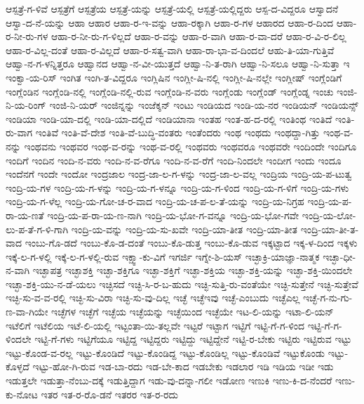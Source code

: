{ಆಸ್ಪತ್ರೆ-ಗ-ಳಿವೆ
ಆಸ್ಪತ್ರೆಗೆ
ಆಸ್ಪತ್ರೆಯ
ಆಸ್ಪತ್ರೆ-ಯನ್ನು
ಆಸ್ಪತ್ರೆ-ಯಲ್ಲಿ
ಆಸ್ಪತ್ರೆ-ಯಲ್ಲಿದ್ದರು
ಆಸ್ಪ-ದ-ವಿದ್ದರೂ
ಆಸ್ವಾದನೆ
ಆಸ್ವಾ-ದ-ನೆ-ಯನ್ನು
ಆಹಾ
ಆಹಾರ
ಆಹಾ-ರ-ಇ-ವನ್ನು
ಆಹಾ-ರಕ್ಕಾಗಿ
ಆಹಾ-ರ-ಗಳ
ಆಹಾರದ
ಆಹಾ-ರ-ದಿಂದ
ಆಹಾ-ರ-ನೀ-ರು-ಗಳ
ಆಹಾ-ರ-ನೀ-ರು-ಗ-ಳಿಲ್ಲದೆ
ಆಹಾ-ರ-ವನ್ನು
ಆಹಾ-ರ-ವಾಗಿ
ಆಹಾ-ರ-ವಾ-ದರೆ
ಆಹಾ-ರ-ವಿ-ರ-ಲಿಲ್ಲ
ಆಹಾ-ರ-ವಿಲ್ಲ-ದಂತೆ
ಆಹಾ-ರ-ವಿಲ್ಲದೆ
ಆಹಾ-ರ-ಸತ್ವ-ವಾಗಿ
ಆಹಾ-ರಾ-ಭಾ-ವ-ದಿಂದಲೆ
ಆಹು-ತಿ-ಯಾ-ಗುತ್ತಿವೆ
ಆಹ್ವಾ-ನ-ಗ-ಳನ್ನಿತ್ತರೂ
ಆಹ್ವಾನದ
ಆಹ್ವಾ-ನ-ವೀ-ಯುತ್ತದೆ
ಆಹ್ವಾ-ನಿ-ತ-ರಾಗಿ
ಆಹ್ವಾ-ನಿ-ಸಲೂ
ಆಹ್ವಾ-ನಿ-ಸುತ್ತಾ
ಇ
ಇಂಕ್ವಾ-ಯ-ರಿಸ್
ಇಂಗಿತ
ಇಂಗಿ-ತ-ವಿದ್ದರೂ
ಇಂಗ್ಲಿಷಿನ
ಇಂಗ್ಲೀ-ಷಿ-ನಲ್ಲಿ
ಇಂಗ್ಲೀ-ಷಿ-ನಲ್ಲೇ
ಇಂಗ್ಲೀಷ್
ಇಂಗ್ಲೆಂಡಿಗೆ
ಇಂಗ್ಲೆಂಡಿನ
ಇಂಗ್ಲೆಂಡಿ-ನಲ್ಲಿ
ಇಂಗ್ಲೆಂಡಿ-ನಲ್ಲಿ-ರುವ
ಇಂಗ್ಲೆಂಡಿ-ನ-ವರು
ಇಂಗ್ಲೆಂಡು
ಇಂಗ್ಲೆಂಡ್
ಇಂಗ್ಲೆಂಡ್ನ
ಇಂಚು
ಇಂಜಿ-ನಿ-ಯ-ರಿಂಗ್
ಇಂಜಿ-ನಿ-ಯರ್
ಇಂಜಿನ್ನನ್ನು
ಇಂಜೆಕ್ಶನ್
ಇಂಟು
ಇಂಡಿಯದ
ಇಂಡಿ-ಯ-ನರ
ಇಂಡಿಯನ್
ಇಂಡಿಯನ್ಸ್
ಇಂಡಿಯಾ
ಇಂಡಿ-ಯಾ-ದಲ್ಲಿ
ಇಂಡಿ-ಯಾ-ದಲ್ಲಿದೆ
ಇಂಡಿಯಾನಾ
ಇಂತಹ
ಇಂತ-ಹ-ದ-ರಲ್ಲಿ
ಇಂತಿಂಥ
ಇಂತಿದೆ
ಇಂತಿ-ರು-ವಾಗ
ಇಂತಿವೆ
ಇಂತಿ-ವೆ-ದೇಶ
ಇಂತಿ-ವೆ-ಬುದ್ಧಿ-ವಂತರು
ಇಂತೆಂದರು
ಇಂಥ
ಇಂಥದು
ಇಂಥದ್ದಾ-ಗಿತ್ತು
ಇಂಥ-ವ-ನನ್ನು
ಇಂಥವನು
ಇಂಥವರ
ಇಂಥ-ವ-ರನ್ನು
ಇಂಥ-ವ-ರಲ್ಲಿ
ಇಂಥವರು
ಇಂಥವರೂ
ಇಂಥವರೇ
ಇಂದಿಂದೇ
ಇಂದಿಗೂ
ಇಂದಿಗೆ
ಇಂದಿನ
ಇಂದಿ-ನ-ವರು
ಇಂದಿ-ನ-ವ-ರೆಗೂ
ಇಂದಿ-ನ-ವ-ರೆಗೆ
ಇಂದಿ-ನಿಂದಲೇ
ಇಂದೀಗ
ಇಂದು
ಇಂದೂ
ಇಂದೆನಗೆ
ಇಂದೇ
ಇಂದೋ
ಇಂದ್ರಜಾಲ
ಇಂದ್ರ-ಜಾ-ಲ-ಗ-ಳನ್ನು
ಇಂದ್ರ-ಜಾ-ಲ-ವಲ್ಲ
ಇಂದ್ರಿಯ
ಇಂದ್ರಿ-ಯ-ಪ-ಟುತ್ವ
ಇಂದ್ರಿ-ಯ-ಗಳ
ಇಂದ್ರಿ-ಯ-ಗ-ಳನ್ನು
ಇಂದ್ರಿ-ಯ-ಗ-ಳನ್ನೂ
ಇಂದ್ರಿ-ಯ-ಗ-ಳಿಂದ
ಇಂದ್ರಿ-ಯ-ಗ-ಳಿಗೆ
ಇಂದ್ರಿ-ಯ-ಗಳು
ಇಂದ್ರಿ-ಯ-ಗ-ಳೆಲ್ಲ
ಇಂದ್ರಿ-ಯ-ಗೋ-ಚ-ರ-ವಾದ
ಇಂದ್ರಿ-ಯ-ಚ-ಪ-ಲ-ತೆ-ಯನ್ನು
ಇಂದ್ರಿ-ಯ-ನಿಗ್ರಹ
ಇಂದ್ರಿ-ಯ-ಪ-ರಾ-ಯ-ಣತೆ
ಇಂದ್ರಿ-ಯ-ಪ-ರಾ-ಯ-ಣ-ನಾಗಿ
ಇಂದ್ರಿ-ಯ-ಭೋ-ಗ-ವನ್ನೂ
ಇಂದ್ರಿ-ಯ-ಭೋ-ಗವೇ
ಇಂದ್ರಿ-ಯ-ಲೋ-ಲು-ಪ-ತೆ-ಗ-ಳಿ-ಗಾಗಿ
ಇಂದ್ರಿ-ಯ-ವನ್ನು
ಇಂದ್ರಿ-ಯ-ಸು-ಖವೇ
ಇಂದ್ರಿ-ಯಾ-ತೀತ
ಇಂದ್ರಿ-ಯಾ-ತೀತ
ಇಂದ್ರಿ-ಯಾ-ತೀ-ತ-ವಾದ
ಇಂಬು-ಗೊ-ಡದೆ
ಇಂಬು-ಕೊ-ಡ-ದಂತೆ
ಇಂಬು-ಕೊ-ಡುತ್ತ
ಇಂಬು-ಕೊ-ಡುವ
ಇಕ್ಕಟ್ಟಾದ
ಇಕ್ಕ-ಳ-ದಿಂದ
ಇಕ್ಕಳು
ಇಕ್ಕೆ-ಲ-ಗ-ಳಲ್ಲಿ
ಇಕ್ಕೆ-ಲ-ಗ-ಳಲ್ಲಿ-ರುವ
ಇಕ್ಷ್ವಾ-ಕು-ವಿಗೆ
ಇಗರ್ಜಿ
ಇಗ್ನೇ-ಶಿ-ಯಸ್
ಇಚ್ಛಾಕ್ರಿ-ಯಾಜ್ಞಾ-ನಾತ್ಮಕ
ಇಚ್ಛಾ-ಧೀ-ನ-ವಾಗಿ
ಇಚ್ಛಾಪತ್ರ
ಇಚ್ಛಾಶಕ್ತಿ
ಇಚ್ಛಾ-ಶಕ್ತಿಗೂ
ಇಚ್ಛಾ-ಶಕ್ತಿಗೆ
ಇಚ್ಛಾ-ಶಕ್ತಿಯ
ಇಚ್ಛಾ-ಶಕ್ತಿ-ಯನ್ನು
ಇಚ್ಛಾ-ಶಕ್ತಿ-ಯಿಂದಲೇ
ಇಚ್ಛಾ-ಶಕ್ತಿ-ಯು-ನ-ಡೆ-ಯಲು
ಇಚ್ಛಿಸದೆ
ಇಚ್ಛಿ-ಸಿ-ರ-ಬ-ಹುದು
ಇಚ್ಛಿ-ಸುತ್ತಿ-ರು-ವಂತೆಯೇ
ಇಚ್ಛಿ-ಸುತ್ತೇನೆ
ಇಚ್ಛಿ-ಸುತ್ತೇವೆ
ಇಚ್ಛಿ-ಸು-ವ-ವ-ರಲ್ಲಿ
ಇಚ್ಛಿ-ಸು-ವಿರಾ
ಇಚ್ಛಿ-ಸು-ವು-ದಿಲ್ಲ
ಇಚ್ಛೆ
ಇಚ್ಛೆಇವು
ಇಚ್ಛೆ-ಎಂಬುದು
ಇಚ್ಛೆಎಲ್ಲ
ಇಚ್ಛೆ-ಗ-ನು-ಗು-ಣ-ವಾ-ಗಿಯೇ
ಇಚ್ಛೆಗಳ
ಇಚ್ಛೆಗೆ
ಇಚ್ಛೆಯ
ಇಚ್ಛೆಯನ್ನು
ಇಚ್ಛೆಯಿಂದ
ಇಚ್ಛೆಯೇ
ಇಟ-ಲಿ-ಯನ್ನು
ಇಟಾ-ಲಿ-ಯನ್
ಇಟೆಲಿಗೆ
ಇಟೆಲಿಯ
ಇಟೆ-ಲಿ-ಯಲ್ಲಿ
ಇಟ್ಟಂತಾ-ಯಿ-ತಲ್ಲವೇ
ಇಟ್ಟರೆ
ಇಟ್ಟಾಗ
ಇಟ್ಟಿಗೆ
ಇಟ್ಟಿ-ಗೆ-ಗ-ಳಿಂದ
ಇಟ್ಟಿ-ಗೆ-ಗ-ಳಿಂದಲೇ
ಇಟ್ಟಿ-ಗೆ-ಗಳು
ಇಟ್ಟಿಗೆಯೂ
ಇಟ್ಟಿದ್ದ
ಇಟ್ಟಿದ್ದರು
ಇಟ್ಟಿದ್ದು
ಇಟ್ಟಿದ್ದೇನೆ
ಇಟ್ಟಿ-ರ-ಬೇಕು
ಇಟ್ಟಿರು
ಇಟ್ಟಿರುವ
ಇಟ್ಟು
ಇಟ್ಟು-ಕೊಂಡ-ವ-ರಲ್ಲ
ಇಟ್ಟು-ಕೊಂಡಿದೆ
ಇಟ್ಟು-ಕೊಂಡಿದ್ದ
ಇಟ್ಟು-ಕೊಂಡಿಲ್ಲ
ಇಟ್ಟು-ಕೊಂಡಿವೆ
ಇಟ್ಟುಕೊಂಡು
ಇಟ್ಟು-ಕೊಳ್ಳದೆ
ಇಟ್ಟು-ಹೋ-ಗಿ-ರುವ
ಇಡ-ಬಾ-ರದು
ಇಡ-ಬೇ-ಕಾದ
ಇಡಬೇಕು
ಇಡಲಾರ
ಇಡಿ
ಇಡಿಯ
ಇಡೀ
ಇಡು
ಇಡುತ್ತಲೇ
ಇಡುತ್ತಾ-ನೆಂಬು-ದಕ್ಕೆ
ಇಡುತ್ತಿದ್ದಾಗ
ಇಡು-ವು-ದನ್ನಾ-ಗಲೀ
ಇಡೋಣ
ಇಣುಕಿ
ಇಣು-ಕಿ-ದ-ನೆಂದರೆ
ಇಣು-ಕು-ನೋಟ
ಇತರ
ಇತ-ರ-ರೊ-ಡನೆ
ಇತರರ
ಇತ-ರ-ರದು
}
